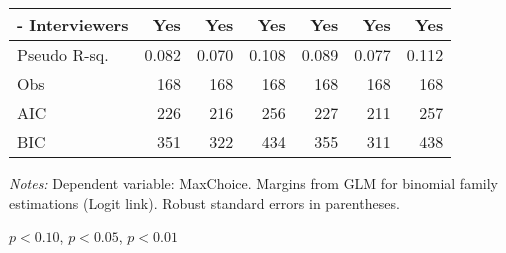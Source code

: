 \begin{table}[htbp]
\begin{adjustbox}{width=1\textwidth}
\begin{threeparttable}
\begin{tabular}{l*{6}{D{.}{.}{-1}}}
- Interviewers        &                 Yes   &                 Yes   &                 Yes   &                 Yes   &                 Yes   &                 Yes   \\
\midrule
Pseudo R-sq.  &  0.082	     &      0.070               &   0.108 &      	0.089             &     0.077                  &        0.112               \\
Obs                 &                 168   &                 168   &                 168   &                 168   &                 168   &                 168   \\
AIC                 &                 226   &                 216   &                 256   &                 227   &                 211   &                 257   \\
BIC                 &                 351   &                 322   &                 434   &                 355   &                 311   &                 438   \\
\bottomrule
\end{tabular}
\begin{tablenotes}
\footnotesize
\item \textit{Notes:} Dependent variable: MaxChoice. Margins from GLM for binomial family estimations (Logit link). Robust standard errors in parentheses. \\
\item \sym{*} \(p<0.10\), \sym{**} \(p<0.05\), \sym{***} \(p<0.01\)
\end{tablenotes}
\end{threeparttable}
\end{adjustbox}
\label{tab:maxchoice_math}
\end{table}
